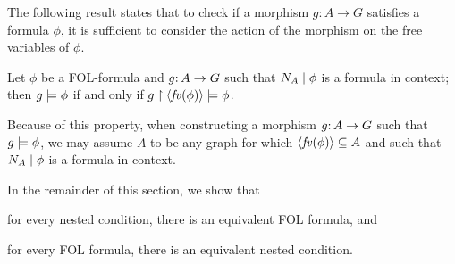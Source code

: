 \begin{comment}
When comparing the satisfaction relations for nested conditions and FOL formulas, a technical issue is that the sets of models for which they are defined are not the same: as seen above, $g\sat\phi$ is defined for $g\of A\to G$ whenever $\fv(\phi)\subseteq N_A$, whereas $g\sat\cT$ for a nested condition $\cT$ is only defined if $A$ is \emph{precisely} $I_\cT$. Due to this discrepancy, there cannot be any $\phi$ and $\cT$ such that $g\sat \phi$ if and only if $g\sat \cT$; instead, the best we can hope for is that this holds whenever $A=\tupof{\fv(\phi)}$. The following property implies that this is indeed all we need to be interested in, since $g$-images for $A$-elements outside $\fv(\phi)$ do not make a difference for satisfaction.

\begin{proposition}\label{prop:free vars only-old}
Let $\phi$ be a FOL-formula and $g\of A\to G$ such that $\fv(\phi)\subseteq N_A$; then $g\sat \phi$ if and only if $g\restr \tupof{\fv(\phi)}\sat \phi$.
\end{proposition}
%
Because of this property, when constructing a morphism $g\of A\to G$ such that $g\sat \phi$, we may assume $A$ to be any graph for which $\tupof{\fv(\phi)}\subseteq A$, without loss of generality.
\end{comment}

The following result states that to check if a morphism $g:A \to G$ satisfies a formula $\phi$, it is sufficient to consider the action of the morphism on the free variables of $\phi$.

\begin{proposition}\label{prop:free vars only}
	Let $\phi$ be a FOL-formula and $g{:}\, A\rightarrow G$ such that ${N_A} \mid {\phi}$ is a formula in context; then $g\models \phi$ if and only if $g\restriction \langle \mathit{fv}(\phi)\rangle\models \phi$.
\end{proposition}
%
Because of this property, when constructing a morphism $g{:}\, A\rightarrow G$ such that $g\models \phi$, we may assume $A$ to be any graph for which $\langle \mathit{fv}(\phi)\rangle\subseteq A$ and such that ${N_A} \mid {\phi}$ is a formula in context.

\medskip

In the remainder of this section, we show that
%
\begin{inumerate}
\item for every nested condition, there is an 
equivalent FOL formula, and
\item for every FOL formula, there is an 
equivalent nested condition.
\end{inumerate}
%
